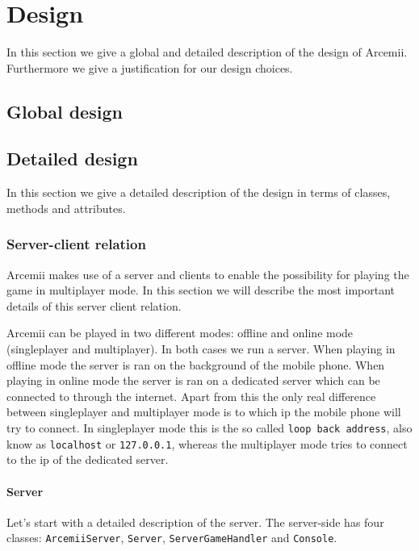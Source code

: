 \documentclass[../main.tex]{subfiles}
\begin{document}
\pagebreak

\section{Design}
In this section we give a global and detailed description of the design of Arcemii. Furthermore we give a justification for our design choices.

    \subsection{Global design}

    \subsection{Detailed design}
    In this section we give a detailed description of the design in terms of classes, methods and attributes.

        \subsubsection{Server-client relation}
        Arcemii makes use of a server and clients to enable the possibility for playing the game in multiplayer mode. In this section we will describe the most important details of this server client relation.

        Arcemii can be played in two different modes: offline and online mode (singleplayer and multiplayer). In both cases we run a server. When playing in offline mode the server is ran on the background of the mobile phone. When playing in online mode the server is ran on a dedicated server which can be connected to through the internet. Apart from this the only real difference between singleplayer and multiplayer mode is to which ip the mobile phone will try to connect. In singleplayer mode this is the so called \texttt{loop back address}, also know as \texttt{localhost} or \texttt{127.0.0.1}, whereas the multiplayer mode tries to connect to the ip of the dedicated server. 

        \paragraph{Server} 
        Let's start with a detailed description of the server. The server-side has four classes: \texttt{ArcemiiServer}, \texttt{Server}, \texttt{ServerGameHandler} and \texttt{Console}. 
        
\end{document}
